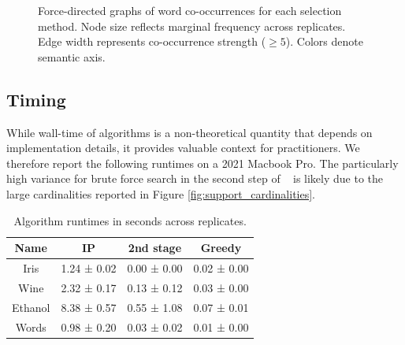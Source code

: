 \begin{figure}[h]
    \caption{Force-directed graphs of word co-occurrences for each selection method.
    Node size reflects marginal frequency across replicates.
    Edge width represents co-occurrence strength ($\geq 5$).
    Colors denote semantic axis.}
    \label{fig:co_occurrence_graphs}
\end{figure}


\subsection{Timing}
\label{sec:timing}

While wall-time of algorithms is a non-theoretical quantity that depends on implementation details, it provides valuable context for practitioners.
We therefore report the following runtimes on a 2021 Macbook Pro.
The particularly high variance for brute force search in the second step of \tsip~ is likely due to the large cardinalities reported in Figure \ref{fig:support_cardinalities}.

\begin{table}[H]
\centering
\begin{tabular}{|c|c|c|c}
\toprule
Name & IP & 2nd stage & Greedy \\
\midrule
Iris & 1.24 ± 0.02 & 0.00 ± 0.00 & 0.02 ± 0.00 \\
Wine & 2.32 ± 0.17 & 0.13 ± 0.12 & 0.03 ± 0.00 \\
Ethanol & 8.38 ± 0.57 & 0.55 ± 1.08 & 0.07 ± 0.01 \\
Words & 0.98 ± 0.20 & 0.03 ± 0.02 & 0.01 ± 0.00 \\
\bottomrule
\end{tabular}
\caption{Algorithm runtimes in seconds across replicates.}
\end{table}